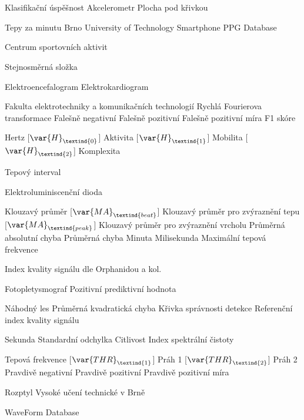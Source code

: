 \cleardoublepage
\chapter*{\listofabbrevname}
{}

\begin{acronym}[KolikMista]	%

			{Klasifikační úspěšnost}
			{Akcelerometr}
			{Plocha pod křivkou}

			{Tepy za minutu}
		{Brno University of Technology Smartphone PPG Database}

			{Centrum sportovních aktivit}

			{Stejnosměrná složka}

			{Elektroencefalogram}
			{Elektrokardiogram}

			{Fakulta elektrotechniky a komunikačních technologií}
			{Rychlá Fourierova transformace}
			{Falešně negativní}
			{Falešně pozitivní}
			{Falešně pozitivní míra}
			{F1 skóre}

			{Hertz}
		[\ensuremath{\var{H}_\textind{0}}]
		{Aktivita}
		[\ensuremath{\var{H}_\textind{1}}]
		{Mobilita}
		[\ensuremath{\var{H}_\textind{2}}]
		{Komplexita}

			{Tepový interval}

			{Elektroluminiscenční dioda}

			{Klouzavý průměr}
		[\ensuremath{\var{MA}_\textind{beat}}]
		{Klouzavý průměr pro zvýraznění tepu}
		[\ensuremath{\var{MA}_\textind{peak}}]
		{Klouzavý průměr pro zvýraznění vrcholu}
			{Průměrná absolutní chyba}
			{Průměrná chyba}
			{Minuta}
			{Milisekunda}
			{Maximální tepová frekvence}

		{Index kvality signálu dle Orphanidou a kol.}
	
			{Fotopletysmograf}
			{Pozitivní prediktivní hodnota}

			{Náhodný les}
			{Průměrná kvadratická chyba}
			{Křivka správnosti detekce}
		{Referenční index kvality signálu}

			{Sekunda}
			{Standardní odchylka}
			{Citlivost}
			{Index spektrální čistoty}
	
			{Tepová frekvence}
		[\ensuremath{\var{THR}_\textind{1}}]
		{Práh 1}
		[\ensuremath{\var{THR}_\textind{2}}]
		{Práh 2}
			{Pravdivě negativní}
			{Pravdivě pozitivní}
			{Pravdivě pozitivní míra}

			{Rozptyl}
			{Vysoké učení technické v Brně}

			{WaveForm Database}

\end{acronym}
